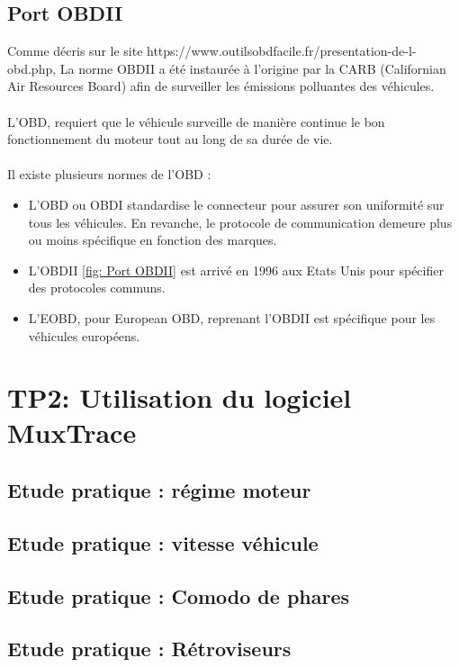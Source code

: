 \documentclass{rapportECC}
\begin{document}
\subsection{Port OBDII}
Comme décris sur le site https://www.outilsobdfacile.fr/presentation-de-l-obd.php, La norme OBDII a été instaurée à l'origine par la CARB (Californian Air Resources Board) afin de surveiller les émissions polluantes des véhicules.  
\\
\\
L'OBD, requiert que le véhicule surveille de manière continue le bon fonctionnement du moteur tout au long de sa durée de vie.
\\
\\
Il existe plusieurs normes de l'OBD : 
\begin{itemize}
    \item L'OBD ou OBDI standardise le connecteur pour assurer son uniformité sur tous les véhicules. En revanche, le protocole de communication demeure plus ou moins spécifique en fonction des marques.
    \item L'OBDII \ref{fig: Port OBDII} est arrivé en 1996 aux Etats Unis pour spécifier des protocoles communs.
    \item L'EOBD, pour European OBD, reprenant l'OBDII est spécifique pour les véhicules européens.
\end{itemize}


\section{TP2: Utilisation du logiciel MuxTrace}

\subsection{Etude pratique : régime moteur}

\subsection{Etude pratique : vitesse véhicule}

\subsection{Etude pratique : Comodo de phares}

\subsection{Etude pratique : Rétroviseurs}
\end{document}
